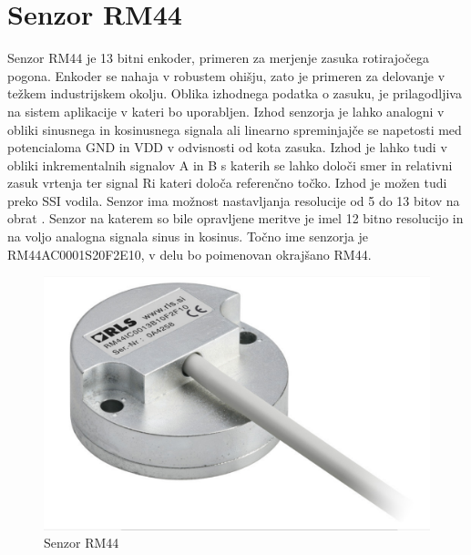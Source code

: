 \chapter{Senzor RM44}
Senzor RM44 je 13 bitni enkoder, primeren za merjenje zasuka rotirajočega pogona\cite{RM44}.
Enkoder se nahaja v robustem ohišju, zato je primeren za delovanje v težkem industrijskem okolju. %
Oblika izhodnega podatka o zasuku, je prilagodljiva na sistem aplikacije v kateri bo uporabljen\cite{Ambrozic}. Izhod senzorja je lahko analogni v obliki sinusnega in kosinusnega signala ali linearno spreminjajče
se napetosti med potencialoma GND in VDD v odvisnosti od kota zasuka.
Izhod je lahko tudi v obliki inkrementalnih signalov A in B s katerih se lahko določi smer in relativni zasuk vrtenja ter signal Ri kateri določa referenčno točko. Izhod je možen tudi preko SSI vodila. Senzor ima
možnost nastavljanja resolucije od 5 do 13 bitov na obrat \cite{AM8192}\cite{RM44}. Senzor na katerem so bile opravljene meritve je imel 12 bitno resolucijo in na voljo analogna signala sinus in kosinus. Točno ime senzorja je
RM44AC0001S20F2E10, v delu bo poimenovan okrajšano RM44.
\begin{figure}[ht]
	\centering
	\includegraphics[width=0.6\columnwidth]{./Slike/senzorRM44.jpg}
	\caption{Senzor RM44}
	\label{RM44}
\end{figure}

